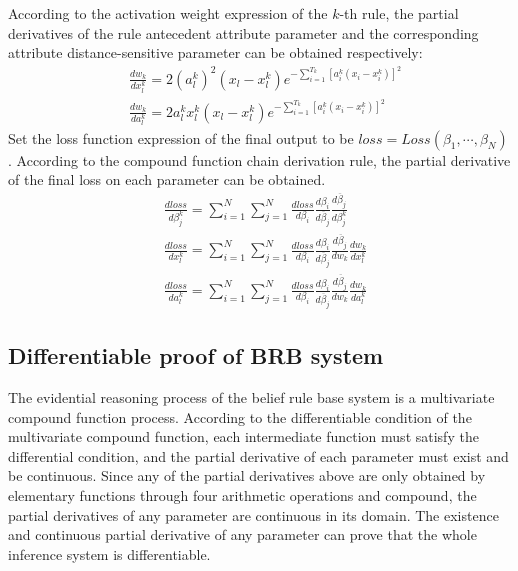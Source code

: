 \documentclass{ieeeaccess}
\begin{document}
According to the activation weight expression of the $k$-th rule, the partial derivatives of the rule antecedent attribute parameter and the corresponding attribute distance-sensitive parameter can be obtained respectively:
\begin{align}
     & \frac{dw_k}{dx_l^k}=2(a_l^k)^2(x_l-x_l^k)e^{-\sum_{i=1}^{T_k}[a_i^k(x_i-x_i^k)]^2}  \\
     & \frac{dw_k}{da_l^k}=2a_l^kx_l^k(x_l-x_l^k)e^{-\sum_{i=1}^{T_k}[a_i^k(x_i-x_i^k)]^2}
\end{align}
Set the loss function expression of the final output to be $loss=Loss(\beta_1,\cdots,\beta_N)$.
According to the compound function chain derivation rule, the partial derivative of the final loss on each parameter can be obtained.
\begin{align}
     & \frac{dloss}{d\beta_j^k}=\sum_{i=1}^N\sum_{j=1}^N\frac{dloss}{d\beta_i}\frac{d\beta_i}{d\overline{\beta}_j}\frac{d\overline{\beta}_j}{d\beta_j^k}          \\
     & \frac{dloss}{dx_l^k}=\sum_{i=1}^N\sum_{j=1}^N\frac{dloss}{d\beta_i}\frac{d\beta_i}{d\overline{\beta}_j}\frac{d\overline{\beta}_j}{dw_k}\frac{dw_k}{dx_l^k} \\
     & \frac{dloss}{da_l^k}=\sum_{i=1}^N\sum_{j=1}^N\frac{dloss}{d\beta_i}\frac{d\beta_i}{d\overline{\beta}_j}\frac{d\overline{\beta}_j}{dw_k}\frac{dw_k}{da_l^k}
\end{align}

\subsection{Differentiable proof of BRB system}
The evidential reasoning process of the belief rule base system is a multivariate compound function process.
According to the differentiable condition of the multivariate compound function, each intermediate function must satisfy the differential condition,
and the partial derivative of each parameter must exist and be continuous.
Since any of the partial derivatives above are only obtained by elementary functions through four arithmetic operations and compound,
the partial derivatives of any parameter are continuous in its domain.
The existence and continuous partial derivative of any parameter can prove that the whole inference system is differentiable.
\end{document}
